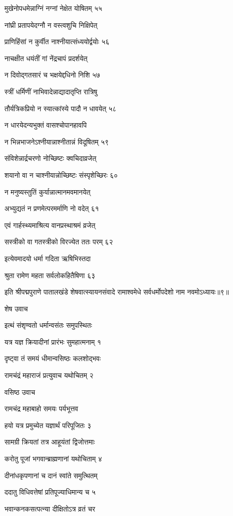 मुखेनोपधमेन्नाग्निं नग्नां नेक्षेत योषितम् ५५

नांघ्री प्रतापयेदग्नौ न वस्त्वशुचि निक्षिपेत्

प्राणिहिंसां न कुर्वीत नाश्नीयात्संध्ययोर्द्वयोः ५६

नाचक्षीत धयंतीं गां नेंद्रचापं प्रदर्शयेत्

न दिवोद्गतसारं च भक्षयेद्दधिनो निशि ५७

स्त्रीं धर्मिणीं नाभिवादेन्नाद्यादातृप्ति रात्रिषु

तौर्यत्रिकप्रियो न स्यात्कांस्ये पादौ न धावयेत् ५८

न धारयेदन्यभुक्तं वासश्चोपानहावपि

न भिन्नभाजनेऽश्नीयान्नाश्नीतान्नं विदूषितम् ५९

संविशेन्नार्द्रचरणो नोच्छिष्टः क्वचिदाव्रजेत्

शयानो वा न चाश्नीयान्नोच्छिष्टः संस्पृशेच्छिरः ६०

न मनुष्यस्तुतिं कुर्यान्नात्मानमवमानयेत्

अभ्युद्यतं न प्रणमेत्परमर्माणि नो वदेत् ६१

एवं गार्हस्थ्यमाश्रित्य वानप्रस्थाश्रमं व्रजेत्

सस्त्रीको वा गतस्त्रीको विरज्येत ततः परम् ६२

इत्येवमादयो धर्मा गदिता ऋषिभिस्तदा

श्रुता रामेण महता सर्वलोकहितैषिणा ६३

इति श्रीपद्मपुराणे पातालखंडे शेषवात्स्यायनसंवादे रामाश्वमेधे सर्वधर्मोपदेशो नाम नवमोऽध्यायः॥९॥


शेष उवाच

इत्थं संशृण्वतो धर्मान्वसंतः समुपस्थितः

यत्र यज्ञ क्रियादीनां प्रारंभः सुमहात्मनाम् १

दृष्ट्वा तं समयं धीमान्वसिष्ठः कलशोद्भवः

रामचंद्रं महाराजं प्रत्युवाच यथोचितम् २

वसिष्ठ उवाच

रामचंद्र महाबाहो समयः पर्यभूत्तव

हयो यत्र प्रमुच्येत यज्ञार्थं परिपूजितः ३

सामग्री क्रियतां तत्र आहूयंतां द्विजोत्तमाः

करोतु पूजां भगवान्ब्राह्मणानां यथोचिताम् ४

दीनांधकृपणानां च दानं स्वांते समुत्थितम्

ददातु विधिवत्तेषां प्रतिपूज्याधिमान्य च ५

भवान्कनकसत्पत्न्या दीक्षितोऽत्र व्रतं चर

